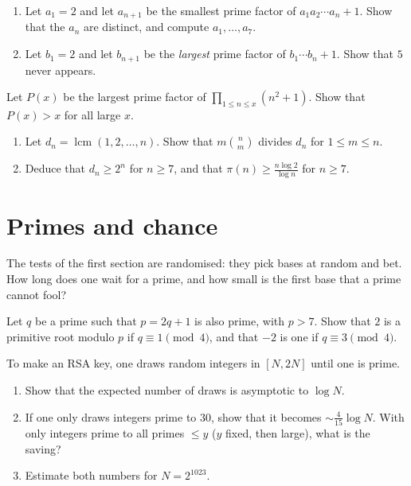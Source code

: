 \begin{exercise}[$\star\star$]\label{pb:mullin}
\begin{enumerate}[label=(\alph*)]
\item Let $a_1=2$ and let $a_{n+1}$ be the smallest prime factor of $a_1a_2\cdots a_n+1$. Show that the $a_n$ are distinct, and
compute $a_1,\dots,a_7$.
\item Let $b_1=2$ and let $b_{n+1}$ be the \emph{largest} prime factor of $b_1\cdots b_n+1$. Show that $5$ never appears.
\end{enumerate}
\end{exercise}

\begin{exercise}[$\star\star\star$]\label{pb:nsq1}
Let $P(x)$ be the largest prime factor of $\prod_{1\le n\le x}(n^2+1)$. Show that $P(x)>x$ for all large $x$.
\end{exercise}

\begin{exercise}[$\star\star$]\label{pb:nair}
\begin{enumerate}[label=(\alph*)]
\item Let $d_n=\operatorname{lcm}(1,2,\dots,n)$. Show that $m\binom nm$ divides $d_n$ for $1\le m\le n$.
\item Deduce that $d_n\ge2^n$ for $n\ge7$, and that $\pi(n)\ge\frac{n\log2}{\log n}$ for $n\ge7$.
\end{enumerate}
\end{exercise}

\section{Primes and chance}

The tests of the first section are randomised: they pick bases at random and bet. How long does one wait for a prime,
and how small is the first base that a prime cannot fool?

\begin{exercise}[$\star$]\label{pb:artin}
Let $q$ be a prime such that $p=2q+1$ is also prime, with $p>7$. Show that $2$ is a primitive root modulo $p$ if
$q\equiv1\pmod4$, and that $-2$ is one if $q\equiv3\pmod4$.
\end{exercise}

\begin{exercise}[$\star$]\label{pb:findprime}
To make an RSA key, one draws random integers in $[N,2N]$ until one is prime.
\begin{enumerate}[label=(\alph*)]
\item Show that the expected number of draws is asymptotic to $\log N$.
\item If one only draws integers prime to $30$, show that it becomes $\sim\frac4{15}\log N$. With only integers prime to all
primes $\le y$ ($y$ fixed, then large), what is the saving?
\item Estimate both numbers for $N=2^{1023}$.
\end{enumerate}
\end{exercise}


